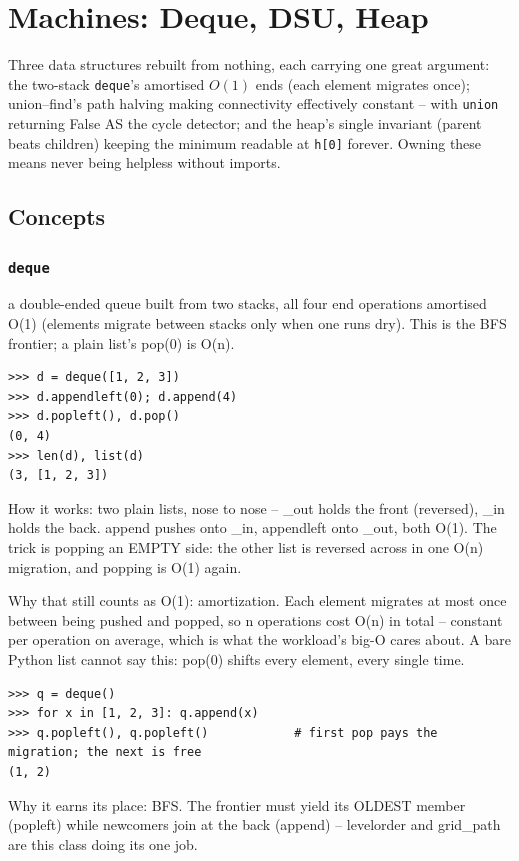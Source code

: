 \documentclass[10pt,letterpaper]{book}
\begin{document}
\chapter{Machines: Deque, DSU, Heap}

Three data structures rebuilt from nothing, each carrying one great argument:
the two-stack \texttt{deque}'s amortised $O(1)$ ends (each element migrates
once); union--find's path halving making connectivity effectively constant
-- with \texttt{union} returning False AS the cycle detector; and the heap's
single invariant (parent beats children) keeping the minimum readable at
\texttt{h[0]} forever. Owning these means never being helpless without
imports.
\section{Concepts}
\subsection{\texttt{deque}}\label{def:deque}
a double-ended queue built from two stacks, all four end operations amortised O(1) (elements migrate between stacks only when one runs dry). This is the BFS frontier; a plain list's pop(0) is O(n).
\begin{lstlisting}[style=ex]
>>> d = deque([1, 2, 3])
>>> d.appendleft(0); d.append(4)
>>> d.popleft(), d.pop()
(0, 4)
>>> len(d), list(d)
(3, [1, 2, 3])
\end{lstlisting}

How it works: two plain lists, nose to nose -- \_out holds the front (reversed), \_in holds the back. append pushes onto \_in, appendleft onto \_out, both O(1). The trick is popping an EMPTY side: the other list is reversed across in one O(n) migration, and popping is O(1) again.


Why that still counts as O(1): amortization. Each element migrates at most once between being pushed and popped, so n operations cost O(n) in total -- constant per operation on average, which is what the workload's big-O cares about. A bare Python list cannot say this: pop(0) shifts every element, every single time.

\begin{lstlisting}[style=ex]
>>> q = deque()
>>> for x in [1, 2, 3]: q.append(x)
>>> q.popleft(), q.popleft()            # first pop pays the migration; the next is free
(1, 2)
\end{lstlisting}

Why it earns its place: BFS. The frontier must yield its OLDEST member (popleft) while newcomers join at the back (append) -- levelorder and grid\_path are this class doing its one job.
\end{document}
